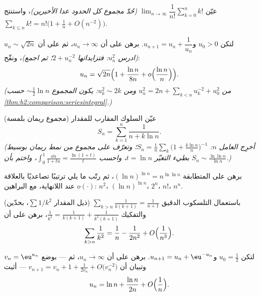 \begin{exercise}[$\star\star$]\label{exo:b2:comparison:7}
عيّن $\lim_{n\to\infty} \dfrac{1}{n!}\sum_{k=0}^{n} k!$
\emph{(حُدّ مجموع كل الحدود عدا الأخيرين)}، واستنتج
 $\sum_{k \leq n} k! = n!\bigl(1 + \frac1n +
O(n^{-2})\bigr)$.
\end{exercise}

\begin{exercise}[$\star\star\star$]\label{exo:b2:comparison:8}
لتكن $u_0 > 0$ و$u_{n+1} = u_n + \dfrac{1}{u_n}$. برهن على أن $u_n
\to \infty$، ثم على أن $u_n \sim \sqrt{2n}$ \emph{(ادرس $u_n^2$:
فتزايداتها $2 + u_n^{-2}$؛ ثم اجمع)}، ونقّح:
\[
u_n = \sqrt{2n}\Bigl(1 + \frac{\ln n}{8n} +
o\Bigl(\frac{\ln n}{n}\Bigr)\Bigr).
\]
\emph{(من $u_n^2 = 2n + \sum_{k<n} u_k^{-2} + u_0^2$ ومن $u_k^2
\sim 2k$: يكون المجموع $\sim \frac12\ln n$ حسب
\cref{thm:b2:comparison:seriesintegral}.)}
\end{exercise}

\begin{exercise}[$\star\star\star$]\label{exo:b2:comparison:9}
(مجموع ريمان بلمسة) عيّن السلوك المقارب للمقدار
\[
S_n = \sum_{k=1}^{n} \frac{1}{n + k\ln n} .
\]
\emph{(أخرِج العامل $n$: $S_n = \frac1n\sum_k \bigl(1 +
\frac{k\ln n}{n}\bigr)^{-1}$؛ وتعرّف على مجموع من نمط ريمان بوسيط
بطيء التغيّر $t = \ln n$، واحسب $\int_0^1
\frac{\dd u}{1 + tu} = \frac{\ln(1+t)}{t}$، واختم بأن $S_n \sim
\frac{\ln\ln n}{\ln n}$.)}
\end{exercise}

\begin{exercise}[$\star$]\label{exo:b2:comparison:10}
برهن على المتطابقة $(\ln n)^{\ln n} = n^{\ln\ln n}$، ثم رتّب
ما يلي ترتيبًا تصاعديًا بالعلاقة $o(\cdot)$ عند اللانهاية، مع
البراهين: $n^2$، $(\ln n)^{\ln n}$، $2^n$، $n!$، $n^n$.
\end{exercise}

\begin{exercise}[$\star\star$]\label{exo:b2:comparison:11}
(ذيل المقدار $\sum 1/k^2$، بحدّين) باستعمال التلسكوب الدقيق
$\sum_{k > n} \frac{1}{k(k+1)} = \frac{1}{n+1}$ والتفكيك
$\frac1{k^2} = \frac{1}{k(k+1)} +
\frac{1}{k^2(k+1)}$، برهن على أن
\[
\sum_{k > n} \frac{1}{k^2}
= \frac1n - \frac{1}{2n^2} + O\Bigl(\frac{1}{n^3}\Bigr).
\]
\end{exercise}

\begin{exercise}[$\star\star\star$]\label{exo:b2:comparison:12}
لتكن $u_0 = \frac12$ و$u_{n+1} = u_n + \eu^{-u_n}$. برهن على أن
$u_n \to \infty$، ثم --- بوضع $v_n = \eu^{u_n}$ وتبيان أن
$v_{n+1} = v_n + 1 + \frac{1}{2v_n} + O\bigl(v_n^{-2}\bigr)$ ---
أثبت
\[
u_n = \ln n + \frac{\ln n}{2n} + O\Bigl(\frac1n\Bigr).
\]
\end{exercise}

